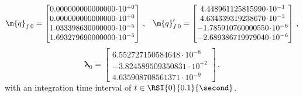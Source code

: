 %
\begin{equation*}
  \m{q}_{f\,0}^{\phantom{\prime}} = \begin{bmatrix}
    0.000000000000000\!\cdot\!10^{+0} \\
    0.000000000000000\!\cdot\!10^{+0} \\
    1.033398630000000\!\cdot\!10^{-5} \\
    1.693279690000000\!\cdot\!10^{-5}
  \end{bmatrix} \, \text{,} \quad
  \m{q}^{\prime}_{f\,0} = \begin{bmatrix}
     4.448961125815990\!\cdot\!10^{-1} \\
     4.634339319238670\!\cdot\!10^{-3} \\
    -1.785910760000550\!\cdot\!10^{-6} \\
    -2.689386719979040\!\cdot\!10^{-6}
  \end{bmatrix} \, \text{,}
\end{equation*}
%
\begin{equation*}
  \bm{\lambda}_{0} = \begin{bmatrix}
     6.552727150584648\!\cdot\!10^{-8} \\
    -3.824589509350831\!\cdot\!10^{+2} \\
     4.635908708561371\!\cdot\!10^{-9}
  \end{bmatrix} \, \text{,}
\end{equation*}
%
with an integration time interval of $t \in \RSI{0}{0.1}{\second}$.

